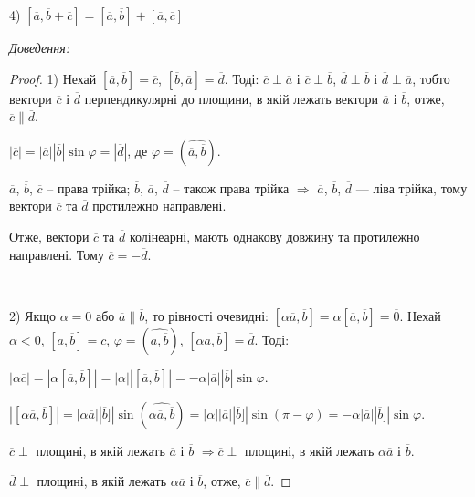 4) $[\overline{a}, \overline{b} + \overline{c}] = [\overline{a}, \overline{b}] + [\overline{a}, \overline{c}]$

\textit{Доведення:}

\begin{proof}
	1) Нехай $[\overline{a}, \overline{b}] = \overline{c}$, $[\overline{b}, \overline{a}] = \overline{d}$.
	Тоді: $\overline{c} \perp \overline{a}$ і $\overline{c} \perp \overline{b}$,
	$\overline{d} \perp \overline{b}$ і $\overline{d} \perp \overline{a}$, тобто вектори $\overline{c}$
	і $\overline{d}$ перпендикулярні до площини, в якій лежать вектори $\overline{a}$ і $\overline{b}$,
	отже, $\overline{c} \parallel \overline{d}$.
	
	$|\overline{c}| = |\overline{a}||\overline{b}|\sin\varphi = |\overline{d}|$, де
	$\varphi = (\widehat{\overline{a},\overline{b}})$.
	
	$\overline{a}$, $\overline{b}$, $\overline{c}$ -- права трійка; $\overline{b}$, $\overline{a}$,
	$\overline{d}$ -- також права трійка $\Rightarrow$ $\overline{a}$, $\overline{b}$, $\overline{d}$
	--- ліва трійка, тому вектори $\overline{c}$ та $\overline{d}$ протилежно направлені.
	
	Отже, вектори $\overline{c}$ та $\overline{d}$ колінеарні, мають однакову довжину та протилежно
	направлені. Тому $\overline{c} = -\overline{d}$.

	~	
	
	2) Якщо $\alpha = 0$ або $\overline{a} \parallel \overline{b}$, то рівності очевидні: 
	$[\alpha \overline{a}, \overline{b}] = \alpha [\overline{a}, \overline{b}] = \overline{0}$.
	Нехай $\alpha < 0$, $[\overline{a}, \overline{b}] = \overline{c}$,
	$\varphi = (\widehat{\overline{a}, \overline{b}})$, $[\alpha \overline{a}, \overline{b}] = \overline{d}$.
	Тоді:
	
	$|\alpha \overline{c}| = |\alpha [\overline{a}, \overline{b}]| = |\alpha| |[\overline{a}, \overline{b}]|
	= -\alpha |\overline{a}| |\overline{b}| \sin\varphi$.
	
	$|[\alpha \overline{a}, \overline{b}]|
	= |\alpha \overline{a}| |\overline{b}]|\sin(\widehat{\alpha \overline{a},\overline{b}})
	= |\alpha| |\overline{a}| |\overline{b}]|\sin(\pi - \varphi)
	= -\alpha |\overline{a}| |\overline{b}]| \sin\varphi$.
	
	$\overline{c}\perp$ площині, в якій лежать $\overline{a}$ і $\overline{b}$
	$\Rightarrow \overline{c} \perp$ площині, в якій лежать $\alpha \overline{a}$ і $\overline{b}$.
	
	$\overline{d}\perp$ площині, в якій лежать $\alpha \overline{a}$ і $\overline{b}$, отже,
	$\overline{c} \parallel \overline{d}$.
	

\end{proof}
